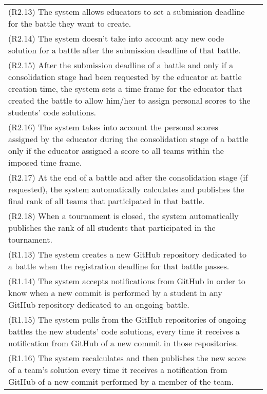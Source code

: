 \begin{longtable}{|p{8cm}|p{8cm}|}
(R2.13) The system allows educators to set a submission deadline for the battle they want to create. & \\
(R2.14) The system doesn't take into account any new code solution for a battle after the submission deadline of that battle. & \\
(R2.15) After the submission deadline of a battle and only if a consolidation stage had been requested by the educator at battle creation time, the system sets a time frame for the educator that created the battle to allow him/her to assign personal scores to the students’ code solutions. & \\
(R2.16) The system takes into account the personal scores assigned by the educator during the consolidation stage of a battle only if the educator assigned a score to all teams within the imposed time frame. & \\
(R2.17) At the end of a battle and after the consolidation stage (if requested), the system automatically calculates and publishes the final rank of all teams that participated in that battle. & \\
(R2.18) When a tournament is closed, the system automatically publishes the rank of all students that participated in the tournament. & \\
(R1.13) The system creates a new GitHub repository dedicated to a battle when the registration deadline for that battle passes. & \\
(R1.14) The system accepts notifications from GitHub in order to know when a new commit is performed by a student in any GitHub repository dedicated to an ongoing battle. & \\
(R1.15) The system pulls from the GitHub repositories of ongoing battles the new students' code solutions, every time it receives a notification from GitHub of a new commit in those repositories. & \\
(R1.16) The system recalculates and then publishes the new score of a team's solution every time it receives a notification from GitHub of a new commit performed by a member of the team. & \\
\hline
\end{longtable}

\vspace{1cm}

